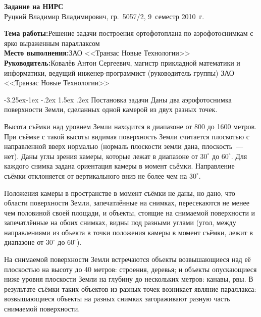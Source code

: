 \documentclass[a4paper,10pt]{article}
\makeatletter
\renewcommand\paragraph{\@startsection{paragraph}{4}{\z@}%
  {-3.25ex\@plus -1ex \@minus -.2ex}%
  {1.5ex \@plus .2ex}%
  {\normalfont\normalsize\bfseries}}
\makeatother
\begin{document}
\begin{center}
\begin{spacing}{1.3}
  {\Large\bfseries Задание на НИРС} \\
  {\large Руцкий Владимир Владимирович, гр.~5057/2, 9~семестр 2010~г.}
\end{spacing}
\end{center}

\noindent\textbf{Тема работы:}\quad Решение задачи построения ортофотоплана по аэрофотоснимкам с ярко выраженным параллаксом \\
\textbf{Место выполнения:}\quad ЗАО <<Транзас Новые Технологии>> \\
\textbf{Руководитель:}\quad Ковалёв Антон Сергеевич, 
магистр прикладной математики и информатики, 
ведущий инженер-программист (руководитель группы) ЗАО <<Транзас Новые Технологии>>

\paragraph{Постановка задачи}
Даны два аэрофотоснимка поверхности Земли, сделанных одной камерой из двух разных точек.

Высота съёмки над уровнем Земли находится в диапазоне от 800 до 1600 метров.
При съёмке с такой высоты видимая поверхность Земли считается плоскотью с направленной вверх нормалью 
(нормаль плоскости земли дана, плоскость~--- нет).
Даны углы зрения камеры, которые лежат в диапазоне от $30^{\circ}$ до $60^{\circ}$.
Для каждого снимка задана ориентация камеры в момент съёмки.
Направление съёмки отклоняется от вертикального вниз не более чем на $30^{\circ}$.

Положения камеры в пространстве в момент съёмки не даны, но
дано, что области поверхности Земли, запечатлённые на снимках, пересекаются не менее чем половиной своей площади,
и объекты, стоящие на снимаемой поверхности и запечатлённые на обоих снимках, видны под разными углами 
(угол, между направлениями из объекта в точки положения камеры в момент съёмки, 
лежит в диапазоне от $30^{\circ}$ до $60^{\circ}$).

На снимаемой поверхности Земли встречаются объекты возвышающиеся над её плоскостью на высоту до 40 метров: 
строения, деревья; 
и объекты опускающиеся ниже уровня плоскости Земли на глубину до нескольких метров: канавы, рвы.
В результате съёмки таких объектов из разных точек возникает являние параллакса:
возвышающиеся объекты на разных снимках загораживают разную часть снимаемой поверхности.
\end{document}

